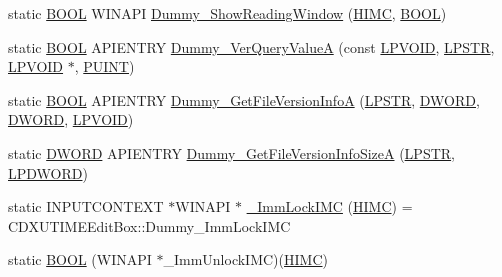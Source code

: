 \begin{DoxyCompactItemize}
\item 
static \hyperlink{class_c_d_x_u_t_i_m_e_edit_box_ad2239c74ad7d59cbb8e6d2b5bf17bcb8}{BOOL} WINAPI \hyperlink{class_c_d_x_u_t_i_m_e_edit_box_acf63c3fc67325d84c868546f4fa45a48}{Dummy\_\-ShowReadingWindow} (\hyperlink{class_c_d_x_u_t_i_m_e_edit_box_aa9afdec726ecd526e2a0abc01537426c}{HIMC}, \hyperlink{class_c_d_x_u_t_i_m_e_edit_box_ad2239c74ad7d59cbb8e6d2b5bf17bcb8}{BOOL})
\item 
static \hyperlink{class_c_d_x_u_t_i_m_e_edit_box_ad2239c74ad7d59cbb8e6d2b5bf17bcb8}{BOOL} APIENTRY \hyperlink{class_c_d_x_u_t_i_m_e_edit_box_af205e8fd2967b53c64f9a1d9a9436130}{Dummy\_\-VerQueryValueA} (const \hyperlink{class_c_d_x_u_t_i_m_e_edit_box_a1fb0e05d8b96c531c1b69d06391b21f7}{LPVOID}, \hyperlink{class_c_d_x_u_t_i_m_e_edit_box_ab59f6a19cb5a1ca421bcb075676ec5f1}{LPSTR}, \hyperlink{class_c_d_x_u_t_i_m_e_edit_box_a1fb0e05d8b96c531c1b69d06391b21f7}{LPVOID} $\ast$, \hyperlink{class_c_d_x_u_t_i_m_e_edit_box_a0bcfcce05c77e66c32a46c02ae6bbed0}{PUINT})
\item 
static \hyperlink{class_c_d_x_u_t_i_m_e_edit_box_ad2239c74ad7d59cbb8e6d2b5bf17bcb8}{BOOL} APIENTRY \hyperlink{class_c_d_x_u_t_i_m_e_edit_box_aa34e1f7d0fb0b2fcd5d668d6f95db8db}{Dummy\_\-GetFileVersionInfoA} (\hyperlink{class_c_d_x_u_t_i_m_e_edit_box_ab59f6a19cb5a1ca421bcb075676ec5f1}{LPSTR}, \hyperlink{class_c_d_x_u_t_i_m_e_edit_box_a4666fce9b285d692ceb0515bf2dbde90}{DWORD}, \hyperlink{class_c_d_x_u_t_i_m_e_edit_box_a4666fce9b285d692ceb0515bf2dbde90}{DWORD}, \hyperlink{class_c_d_x_u_t_i_m_e_edit_box_a1fb0e05d8b96c531c1b69d06391b21f7}{LPVOID})
\item 
static \hyperlink{class_c_d_x_u_t_i_m_e_edit_box_a4666fce9b285d692ceb0515bf2dbde90}{DWORD} APIENTRY \hyperlink{class_c_d_x_u_t_i_m_e_edit_box_a1d4b814a9bc32ee6b96e73a1d0cd8783}{Dummy\_\-GetFileVersionInfoSizeA} (\hyperlink{class_c_d_x_u_t_i_m_e_edit_box_ab59f6a19cb5a1ca421bcb075676ec5f1}{LPSTR}, \hyperlink{class_c_d_x_u_t_i_m_e_edit_box_a13c133202b7126d255528d5573500007}{LPDWORD})
\item 
static INPUTCONTEXT $\ast$WINAPI $\ast$ \hyperlink{class_c_d_x_u_t_i_m_e_edit_box_a5cf2b997f3ea6ca52ce55139373829db}{\_\-ImmLockIMC} (\hyperlink{class_c_d_x_u_t_i_m_e_edit_box_aa9afdec726ecd526e2a0abc01537426c}{HIMC}) = CDXUTIMEEditBox::Dummy\_\-ImmLockIMC
\item 
static \hyperlink{class_c_d_x_u_t_i_m_e_edit_box_af5189ef3dc85e23e56fa3938f7d84248}{BOOL} (WINAPI $\ast$\_\-ImmUnlockIMC)(\hyperlink{class_c_d_x_u_t_i_m_e_edit_box_aa9afdec726ecd526e2a0abc01537426c}{HIMC})

\end{DoxyCompactItemize}
